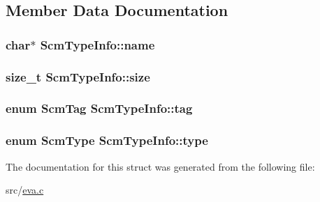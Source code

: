 \subsection{Member Data Documentation}
\hypertarget{struct_scm_type_info_a4f02cc650f88528a74fce2469a22e876}{
\subsubsection[{name}]{\setlength{\rightskip}{0pt plus 5cm}char$\ast$ Scm\-Type\-Info\-::name}}\label{struct_scm_type_info_a4f02cc650f88528a74fce2469a22e876}
\hypertarget{struct_scm_type_info_aadc9bead183de5c73f040483e75f4cda}{
\subsubsection[{size}]{\setlength{\rightskip}{0pt plus 5cm}size\-\_\-t Scm\-Type\-Info\-::size}}\label{struct_scm_type_info_aadc9bead183de5c73f040483e75f4cda}
\hypertarget{struct_scm_type_info_ad0f20b93db78565e8537d101e97d1bf0}{
\subsubsection[{tag}]{\setlength{\rightskip}{0pt plus 5cm}enum {\bf Scm\-Tag} Scm\-Type\-Info\-::tag}}\label{struct_scm_type_info_ad0f20b93db78565e8537d101e97d1bf0}
\hypertarget{struct_scm_type_info_a5175fb185faeb2a7d850722b69261020}{
\subsubsection[{type}]{\setlength{\rightskip}{0pt plus 5cm}enum {\bf Scm\-Type} Scm\-Type\-Info\-::type}}\label{struct_scm_type_info_a5175fb185faeb2a7d850722b69261020}


The documentation for this struct was generated from the following file\-:\begin{DoxyCompactItemize}
\item 
src/\hyperlink{eva_8c}{eva.\-c}\end{DoxyCompactItemize}

